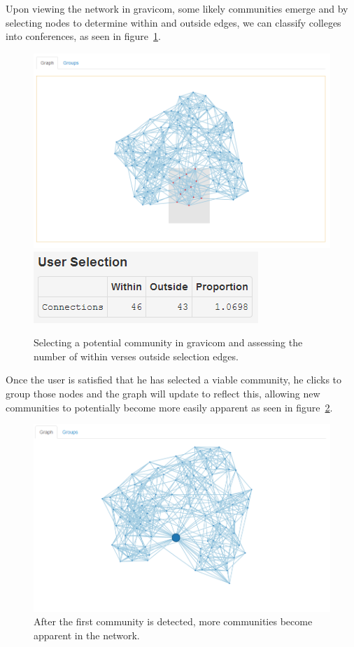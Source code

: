 \documentclass{article}\usepackage[]{graphicx}\usepackage[]{color}
\begin{document}
Upon viewing the network in gravicom, some likely communities emerge and by selecting nodes to determine within and outside edges, we can classify colleges into conferences, as seen in figure~\ref{fig:football_2}.

\begin{figure}[H]
\centering
\includegraphics[width=\textwidth]{images/football_2.png}
\includegraphics[]{images/football_3.png}
\caption{\label{fig:football_2} Selecting a potential community in gravicom and assessing the number of within verses outside selection edges.}
\end{figure}

Once the user is satisfied that he has selected a viable community, he clicks to group those nodes and the graph will update to reflect this, allowing new communities to potentially become more easily apparent as seen in figure~\ref{fig:football_4}. 

\begin{figure}[H]
\centering
\includegraphics[width=\textwidth]{images/football_4.png}
\caption{\label{fig:football_4} After the first community is detected, more communities become apparent in the network.}
\end{figure}
\end{document}
